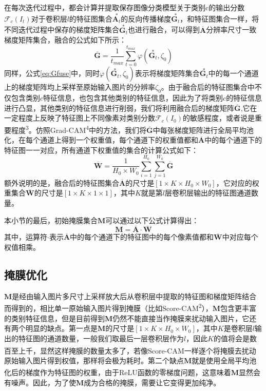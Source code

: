 在每次迭代过程中，都会计算并提取保存图像分类模型关于类别c的输出分数$\mathcal{F}_c(I_t)$对于卷积层$l$的特征图集合$\overset{*}{\boldsymbol{A}_t}$的反向传播梯度$\overset{*}{\boldsymbol{G}_t}$，和特征图集合一样，将不同迭代过程中保存的梯度矩阵集合$\overset{*}{\boldsymbol{G}_t}$也进行融合，可以得到$\overline{\bm{A}}$分辨率尺寸一致梯度矩阵集合，融合的公式如下所示：
\begin{equation}
	\overline{\bm{G}}=\frac{1}{t_{max}}\sum_{t=0}^{t_{max}}\varphi(\overset{*}{\boldsymbol{G}_t},\zeta_0)
	\label{eq:Gfuse}
\end{equation}
同样，公式\ref{eq:Gfuse}中，同时$\varphi(\overset{*}{\boldsymbol{G}_t},\zeta_0)$表示将梯度矩阵集合$\overset{*}{\boldsymbol{G}_t}$中的每一个通道上的梯度矩阵均上采样至原始输入图片的分辨率$\zeta_0$。由于融合后的特征图集合中不仅包含类别$c$特征信息，也包含其他类别的特征信息，因此为了将类别$c$的特征信息进行凸显，其他类别的特征信息进行削弱，我们将利用融合后的梯度矩阵$\overline{\bm{G}}$,它在一定程度上反映了特征图上不同像素对类别分数$\mathcal{F}_c(I_0)$的敏感程度，或者说是重要程度\textsuperscript{\cite{selvaraju2017grad}3}。仿照Grad-CAM\textsuperscript{\cite{selvaraju2017grad}4}中的方法，我们将$\overline{\bm{G}}$中每张梯度矩阵进行全局平均池化，在每个通道上得到一个权重值，每个通道下的权重值都和$\overline{\bm{A}}$中的每个通道下的特征图一一对应，所有通道下权重值的集合的计算公式如下：
\begin{equation}
	\overline{\bm{W}}=\frac{1}{H_0\times W_0}\sum_{i=1}^{H_0}\sum_{j=1}^{W_0}\overline{\bm{G}}
	\label{eq:Wfuse}
\end{equation}
额外说明的是，融合后的特征图集合$\overline{\bm{A}}$的尺寸是$[1\times K \times H_0\times W_0]$，它对应的权重集合$\overline{\bm{W}}$的尺寸是$[1\times K \times 1\times 1]$，其中$K$就是第$l$层卷积层输出的特征图通道数量。

本小节的最后，初始掩膜集合$\boldsymbol{M}$可以通过以下公式计算得出：
\begin{equation}
	\boldsymbol{M}=	\overline{\bm{A}}\cdot\overline{\bm{W}}
\end{equation}
其中，运算符$\cdot$表示$\overline{\bm{A}}$中的每个通道下的特征图中的每个像素值都和$\overline{\boldsymbol{W}}$中对应每个权值相乘。

\subsection{掩膜优化}
$\boldsymbol{M}$是经由输入图片多尺寸上采样放大后从卷积层中提取的特征图和梯度矩阵结合而得到的，相比单一原始输入图片得到掩膜（比如Score-CAM\textsuperscript{\cite{wang2020score}2}），$\boldsymbol{M}$包含更丰富的类别特征信息，但是目前得到$\boldsymbol{M}$仍然不能直接当作掩膜来扰动输入图片，它还有两个明显的缺点。第一点是$\boldsymbol{M}$的尺寸是$[1\times K \times H_0\times W_0]$，其中$K$是卷积层$l$输出的特征图的通道数量，一般我们取最后一层卷积层作为$l$，因此$K$的值将会是数百至上千，显然这样掩膜的数量太多了，若像Score-CAM\textsuperscript{\cite{wang2020score}}一样逐个将掩膜去扰动原始输入图片得到权值，那样将会极为耗时。第二个缺点$\boldsymbol{M}$就是使用全局平均池化后的梯度作为特征图的权重，由于ReLU函数的零梯度问题\textsuperscript{\cite{zhang2021novel}}，这意味着$\boldsymbol{M}$显然会有噪声。因此，为了使$\boldsymbol{M}$成为合格的掩膜，需要让它变得更加纯净。

